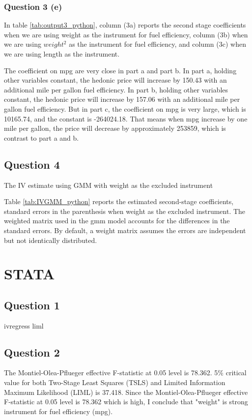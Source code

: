 \documentclass{article}
\begin{document}
\subsubsection{Question 3 (e)}
In table \ref{tab:output3_python}, column (3a) reports the second stage coefficients when we are using weight as the instrument for fuel efficiency, column (3b) when we are using $weight^2$ as the instrument for fuel efficiency, and column (3c) when we are using length as the instrument.

The coefficient on mpg are very close in part a and part b. In part a, holding other variables constant, the hedonic price will increase by 150.43 with an additional mile per gallon fuel efficiency. In part b, holding other variables constant, the hedonic price will increase by 157.06 with an additional mile per gallon fuel efficiency. But in part c, the coefficient on mpg is very large, which is 10165.74, and the constant is -264024.18. That means when mpg increase by one mile per gallon, the price will decrease by approximately 253859, which is contrast to part a and b.

\newpage
\subsection{Question 4 }
\begin{table}[ht]
    \centering
    
    \caption{The IV estimate using GMM with weight as the excluded instrument}
    \label{tab:IVGMM_python}
\end{table}
Table \ref{tab:IVGMM_python} reports the estimated second-stage coefficients, standard errors in the parenthesis when weight as the excluded instrument.
The weighted matrix used in the gmm model accounts for the differences in the standard errors. By default, a weight matrix assumes the errors are independent but not identically distributed.

\section{STATA}
\subsection{Question 1 }

\begin{table}[ht]
    \centering
    
    \caption{ivregress liml}
    \label{tab:q1aIV_stata}
\end{table}

\subsection{Question 2 }
The Montiel-Olea-Pflueger effective F-statistic at 0.05 level is 78.362. 5\% critical value for both Two-Stage Least Squares (TSLS) and Limited Information Maximum Likelihood (LIML) is 37.418. Since the Montiel-Olea-Pflueger effective F-statistic at 0.05 level is 78.362 which is high, I conclude that "weight" is strong instrument for fuel efficiency (mpg).
\end{document}
